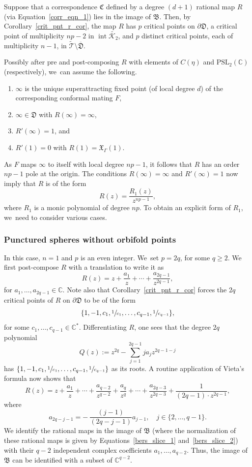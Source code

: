\documentclass[JEP,XML,SOM,Unicode,NoFloatCountersInSection,published]{cedram}
\theoremstyle{definition}
\theoremstyle{remark}
\newcommand{\C}{\mathbb{C}}
\newcommand{\cT}{\mathcal{T}}
\DeclareMathOperator{\Int}{int}
\begin{document}
Suppose that a correspondence $\mathfrak{C}$ defined by a degree $(d+1)$ rational map $R$ (via Equation~\eqref{corr_eqn_1}) lies in the image of $\mathfrak{B}$. Then, by Corollary~\ref{crit_pnt_r_cor}, the map $R$ has $p$ critical points on $\partial\mathfrak{D}$, a critical point of multiplicity $np-2$ in $\Int{\widetilde{\mathcal{K}_2}}$, and $p$ distinct critical points, each of multiplicity $n-1$, in $\widetilde{\cT}\setminus\overline{\mathfrak{D}}$.

Possibly after pre and post-composing $R$ with elements of $C(\eta)$ and $\mathrm{PSL}_2(\C)$ (respectively), we~can assume the following.
\begin{enumerate}
\item $\infty$ is the unique superattracting fixed point (of local degree $d$) of the corresponding conformal mating $F$,
\item $\infty\in\mathfrak{D}$ with $R(\infty)=\infty$,
\item $R'(\infty)=1$, and
\item $R'(1)=0$ with $R(1)=\mathfrak{X}_\Gamma(1)$.
\end{enumerate}
As $F$ maps $\infty$ to itself with local degree $np-1$, it follows that $R$ has an order $np-1$ pole at the origin. The conditions $R(\infty)=\infty$ and $R'(\infty)=1$ now imply that $R$ is of the form
\[
R(z)=\frac{R_1(z)}{z^{np-1}},
\]
where $R_1$ is a monic polynomial of degree $np$. To obtain an explicit form of $R_1$, we~need to consider various cases.

\subsubsection*{Punctured spheres without orbifold points}
In this case, $n=1$ and $p$ is an even integer. We~set $p=2q$, for some $q\geq 2$.
We first post-compose $R$ with a translation to write it as
\[
R(z)=z+\frac{a_1}{z}+\cdots+\frac{a_{2q-1}}{z^{2q-1}},
\]
for $a_1,\dots,a_{2q-1}\in\C$. Note also that Corollary~\ref{crit_pnt_r_cor} forces the $2q$ critical points of $R$ on $\partial\mathfrak{D}$ to be of the form
\[
\{1, -1, c_1,\sfrac{1}{c_1},\dots, c_{q-1},\sfrac{1}{c_{q-1}}\},
\]
for some $c_1,\dots,c_{q-1}\in\C^*$.
Differentiating $R$, one sees that the degree $2q$ polynomial
\[
Q(z):= z^{2q}-\sum_{j=1}^{2q-1} j a_j z^{2q-1-j}
\]
has $\{1, -1, c_1,\sfrac{1}{c_1},\dots, c_{q-1},\sfrac{1}{c_{q-1}}\}$ as its roots.
A routine application of Vieta's formula now shows that
\begin{equation}
R(z)=z+\frac{a_1}{z}+\cdots+\frac{a_{q-2}}{z^{q-2}}+\frac{a_q}{z^q}+\cdots+\frac{a_{2q-3}}{z^{2q-3}}+\frac{1}{(2q-1)\cdot z^{2q-1}},
\label{bers_slice_1}
\end{equation}
where
\begin{equation}
a_{2q-j-1}=-\ \frac{(j-1)}{(2q-j-1)} a_{j-1},\quad j\in\{2,\dots,q-1\}.
\label{bers_slice_2}
\end{equation}
We identify the rational maps in the image of $\mathfrak{B}$ (where the normalization of these rational maps is given by Equations~\eqref{bers_slice_1} and~\eqref{bers_slice_2}) with their $q-2$ independent complex coefficients $a_1,\dots,a_{q-2}$. Thus, the image of $\mathfrak{B}$ can be identified with a subset of $\C^{q-2}$.
\end{document}

